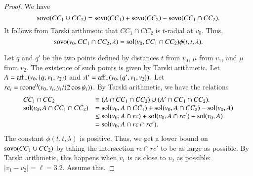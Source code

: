 \begin{proof}
%
We have
 $$
 {\operatorname{sovo}}(CC_1\cup CC_2)=
 {\operatorname{sovo}}(CC_1)+{\operatorname{sovo}}(CC_2)-{\operatorname{sovo}}(CC_1\cap CC_2).
 $$
It follows from Tarski arithmetic that
$CC_1\cap CC_2$ is $t$-radial at $v_0$.  Thus,
$${\operatorname{sovo}}(v_0,CC_1\cap CC_2,\lambda) =
  \operatorname{sol}(v_0,CC_1\cap CC_2)\phi(t,t,\lambda).$$

Let $q$ and $q'$ be the two points defined by distances
$t$ from $v_0$, $\mu$ from $v_1$, and $\mu$ from $v_2$.
The existence of such points is given by Tarski arithmetic.
Let $A={\operatorname{aff}}_+(v_0,\{q,v_1,v_2\})$ and
$A'={\operatorname{aff}}_+(v_0,\{q',v_1,v_2\})$.
Let $rc_i = {\operatorname{rcone}}^0(v_0,v_i,y_i/(2\cos\psi_i))$.
By Tarski arithmetic, we have the relations
$$
\begin{array}{lll}
CC_1\cap CC_2 &\equiv (A\cap CC_1\cap CC_2) \cup (A'\cap CC_1\cap CC_2).\\
\operatorname{sol}(v_0,A\cap CC_1\cap CC_2) &= \operatorname{sol}(v_0,A\cap CC_1) + \operatorname{sol}(v_0,A\cap CC_2)
  -\operatorname{sol}(v_0,A)\\
    &\le \operatorname{sol}(v_0,A\cap rc) + \operatorname{sol}(v_0,A\cap rc') - \operatorname{sol}(v_0,A)\\
    &= \operatorname{sol}(v_0, A \cap rc \cap rc').
\end{array}
$$
The constant $\phi(t,t,\lambda)$ is positive.  Thus, we
get a lower bound on ${\operatorname{sovo}}(CC_1\cup CC_2)$ by taking 
the intersection $rc \cap rc'$ to be as large as possible.
By Tarski arithmetic, 
this happens when $v_1$ is as close to $v_2$ as possible:
$|v_1-v_2|=\ell=3.2$.  Assume this.


\end{proof}
